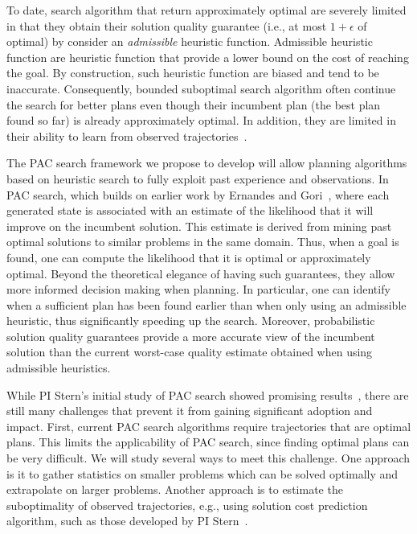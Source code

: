 \documentclass[12pt]{article}
\begin{document}
To date, search algorithm that return approximately optimal are severely limited in that they obtain their solution quality guarantee (i.e., at most $1+\epsilon$ of optimal) by consider an {\em admissible} heuristic function. Admissible heuristic function are heuristic function that provide a lower bound on the cost of reaching the goal. By construction, such heuristic function are biased and tend to be inaccurate. Consequently, bounded suboptimal search algorithm often continue the search for better plans even though their incumbent plan (the best plan found so far) is already approximately optimal. In addition, they are limited in their ability to learn from observed trajectories~\cite{ees,egraphs}.

The PAC search framework we propose to develop will allow planning algorithms based on heuristic search to fully exploit past experience and observations. In PAC search, which builds on earlier work by Ernandes and Gori~\cite{ernandes2004likely}, where each generated state is associated with an estimate of the likelihood that it will improve on the incumbent solution. This estimate is derived from mining past optimal solutions to similar problems in the same domain. Thus, when a goal is found, one can compute the likelihood that it is optimal or approximately optimal. Beyond the theoretical elegance of having such guarantees, they allow more informed decision making when planning. In particular, one can identify when a sufficient plan has been found earlier than when only using an admissible heuristic, thus significantly speeding up the search. Moreover, probabilistic solution quality guarantees 
provide a more accurate view of the incumbent solution than the current worst-case quality estimate obtained when using admissible heuristics.  



While PI Stern's initial study of PAC search showed promising results~\cite{stern2011probably,stern2012search}, there are still many challenges that prevent it from gaining significant adoption and impact. First, current PAC search algorithms require trajectories that are optimal plans. This limits the applicability of PAC search, since finding optimal plans can be very difficult. We will study several ways to meet this challenge. One approach is it to gather statistics on smaller problems which can be solved optimally and extrapolate on larger problems. Another approach is to estimate the suboptimality of observed trajectories, e.g., using solution cost prediction algorithm, such as those developed by PI Stern~\cite{}. 
\end{document}
